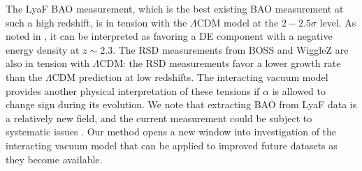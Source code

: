 \documentclass[prd,twocolumn,preprintnumbers,amsmath,amssymb,nofootinbib,english,showpacs]{revtex4-1}
\begin{document}
The LyaF BAO measurement, which is the best existing BAO measurement at such a high redshift, is in tension with the $\Lambda$CDM model at the $2-2.5\sigma$ level. As noted in \cite{Aubourg:2014Nov,Delubac:2014aqe}, it can be interpreted as favoring a DE component with a negative energy density at $z\sim2.3$. The RSD measurements from BOSS and WiggleZ are also in tension with $\Lambda$CDM: the RSD measurements favor a lower growth rate than the $\Lambda$CDM prediction at low redshifts. The interacting vacuum model provides another physical interpretation of these tensions if $\alpha$ is allowed to change sign during its evolution. We note that extracting BAO from LyaF data is a relatively new field, and the current measurement could be subject to systematic issues \cite{Aubourg:2014Nov}. Our method opens a new window into investigation of the interacting vacuum model that can be applied to improved future datasets as they become available.

~
\end{document}

